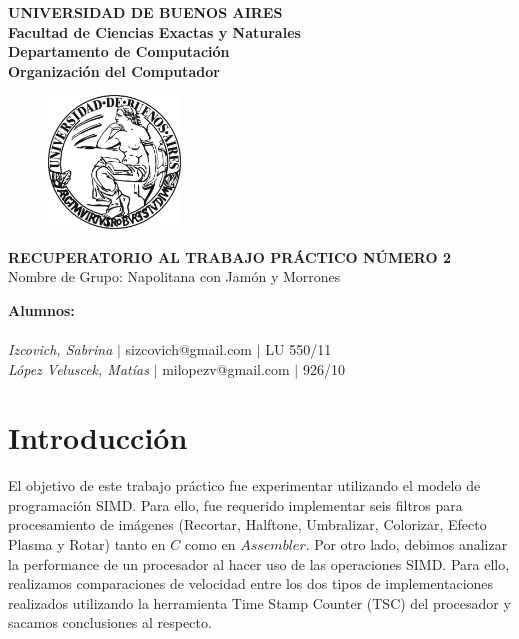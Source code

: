 \documentclass[10pt, a4paper]{article}
\begin{document}
\thispagestyle{empty}
\begin{center}

\Huge{ \bf{UNIVERSIDAD DE BUENOS AIRES}}
\\
\LARGE{\bf{Facultad de Ciencias Exactas y Naturales}}
\\
\textbf{Departamento de Computaci\'on}
\\
\textbf{Organizaci\'on del Computador}
\vspace{2.0\baselineskip}
\end{center}


\begin{figure}[h] %
\begin{center}
\includegraphics[width=100pt]{./image.jpeg}
\end{center}
\end{figure}
\begin{center}
\vspace*{0.7cm}

\huge{\bf RECUPERATORIO AL TRABAJO PR\'ACTICO N\'UMERO 2}\\
\huge{Nombre de Grupo: Napolitana con Jam\'on y Morrones}
\vspace*{8cm}

\end{center}

\huge{\textbf{Alumnos:}}\\
\\
\vspace*{0.3cm}
\Large{\textsl{Izcovich, Sabrina} $|$ sizcovich@gmail.com $|$ LU 550/11}\\
\vspace*{0.3cm}
\Large{\textsl{L\'opez Veluscek, Matías} \hspace{0.1cm}$|$ milopezv@gmail.com $|$ 926/10}\\
 
\newpage
\thispagestyle{empty}
\tableofcontents
\newpage
\section{Introducci\'on}
El objetivo de este trabajo pr\'actico fue experimentar utilizando el modelo de programaci\'on SIMD. Para ello, fue requerido implementar seis filtros para procesamiento de im\'agenes (Recortar, Halftone, Umbralizar, Colorizar, Efecto Plasma y Rotar) tanto en $C$ como en $Assembler$.\newline
Por otro lado, debimos analizar la performance de un procesador al hacer uso de las operaciones SIMD. Para ello, realizamos comparaciones de velocidad entre los dos tipos de implementaciones realizados utilizando la herramienta Time Stamp Counter (TSC) del procesador y sacamos conclusiones al respecto.
\end{document}
